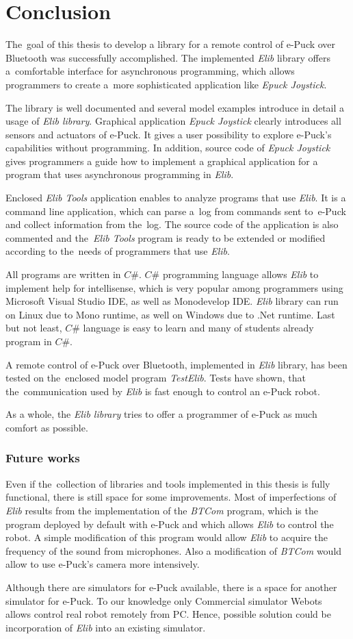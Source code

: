 \chapter{Conclusion} \label{chap:conclusion}
  The~goal of this thesis to develop a library for a remote control of e-Puck 
  over Bluetooth was successfully accomplished.
  The implemented {\it Elib} library offers a~comfortable interface for asynchronous programming,
  which allows programmers to create a~more sophisticated application like {\it Epuck Joystick}.
  
  The library is well documented and several model examples introduce in detail
  a usage of {\it Elib library}.
  Graphical application {\it Epuck Joystick} clearly introduces all sensors and actuators of e-Puck. 
  It gives a user possibility to explore e-Puck's capabilities without programming.
  In addition, source code of {\it Epuck Joystick} gives programmers a guide 
  how to implement a graphical application for a program 
  that uses asynchronous programming in {\it Elib}. 

  Enclosed {\it Elib Tools} application enables to analyze
  programs that use {\it Elib}.
  It is a command line application, which can parse a~log from commands sent 
  to~e-Puck and collect information from the~log.
  The source code of the application is also commented and 
  the~{\it Elib Tools} program is ready to be extended 
  or modified according to the~needs of programmers that use {\it Elib}.
  
  All programs are written in $C\#$.  $C\#$ programming language
  allows {\it Elib} to implement help for intellisense,
  which is very popular among programmers using Microsoft Visual Studio IDE,
  as well as Monodevelop IDE. {\it Elib} library can run on Linux due to
  Mono runtime, as well on Windows due to .Net runtime.
  Last but not least, $C\#$ language is easy to learn 
  and many of students already program in $C\#$.

  A remote control of e-Puck over Bluetooth, implemented in {\it Elib} library, 
  has been tested on the~enclosed model program {\it TestElib}. 
  Tests have shown, that the~communication used by {\it Elib} is fast enough
  to control an e-Puck robot.

  As a whole, the {\it Elib library} tries to offer a programmer
  of e-Puck as much comfort as possible.

\subsection*{Future works}
  Even if the~collection of libraries and tools implemented in this thesis is fully functional,
  there is still space for some improvements.
  Most of imperfections of {\it Elib} results from the implementation 
  of the {\it BTCom} program, which is the program deployed by default with e-Puck 
  and which allows {\it Elib} to control the robot.
  A simple modification of this program would allow {\it Elib} to acquire the frequency 
  of the sound from microphones.
  Also a modification of {\it BTCom} would allow to use e-Puck's camera more intensively.

  Although there are simulators for e-Puck available, 
  there is a space for another simulator for e-Puck. To our knowledge only
  Commercial simulator Webots allows control real robot remotely from PC. 
  Hence, possible solution could be incorporation of {\it Elib} into an existing simulator.
